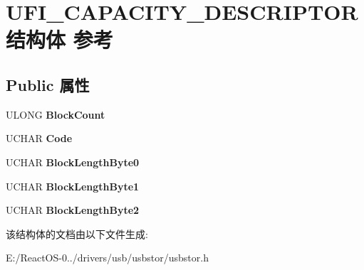 \hypertarget{struct_u_f_i___c_a_p_a_c_i_t_y___d_e_s_c_r_i_p_t_o_r}{}\section{U\+F\+I\+\_\+\+C\+A\+P\+A\+C\+I\+T\+Y\+\_\+\+D\+E\+S\+C\+R\+I\+P\+T\+O\+R结构体 参考}
\label{struct_u_f_i___c_a_p_a_c_i_t_y___d_e_s_c_r_i_p_t_o_r}
\subsection*{Public 属性}
\begin{DoxyCompactItemize}
\item 
\mbox{\label{struct_u_f_i___c_a_p_a_c_i_t_y___d_e_s_c_r_i_p_t_o_r_a1aa1f4d371a7438278ec8fb40e3c2ad8}} 
U\+L\+O\+NG {\bfseries Block\+Count}
\item 
\mbox{\label{struct_u_f_i___c_a_p_a_c_i_t_y___d_e_s_c_r_i_p_t_o_r_aa631b09d98e6472e521aeaa594e93d50}} 
U\+C\+H\+AR {\bfseries Code}
\item 
\mbox{\label{struct_u_f_i___c_a_p_a_c_i_t_y___d_e_s_c_r_i_p_t_o_r_a52d17dfff25f2922e20bc76700f5fd71}} 
U\+C\+H\+AR {\bfseries Block\+Length\+Byte0}
\item 
\mbox{\label{struct_u_f_i___c_a_p_a_c_i_t_y___d_e_s_c_r_i_p_t_o_r_afab307a7d634585af73ce3c1604271f0}} 
U\+C\+H\+AR {\bfseries Block\+Length\+Byte1}
\item 
\mbox{\label{struct_u_f_i___c_a_p_a_c_i_t_y___d_e_s_c_r_i_p_t_o_r_a6605082453f1790f729d4a477f851f26}} 
U\+C\+H\+AR {\bfseries Block\+Length\+Byte2}
\end{DoxyCompactItemize}


该结构体的文档由以下文件生成\+:\begin{DoxyCompactItemize}
\item 
E\+:/\+React\+O\+S-\/0../drivers/usb/usbstor/usbstor.\+h\end{DoxyCompactItemize}
